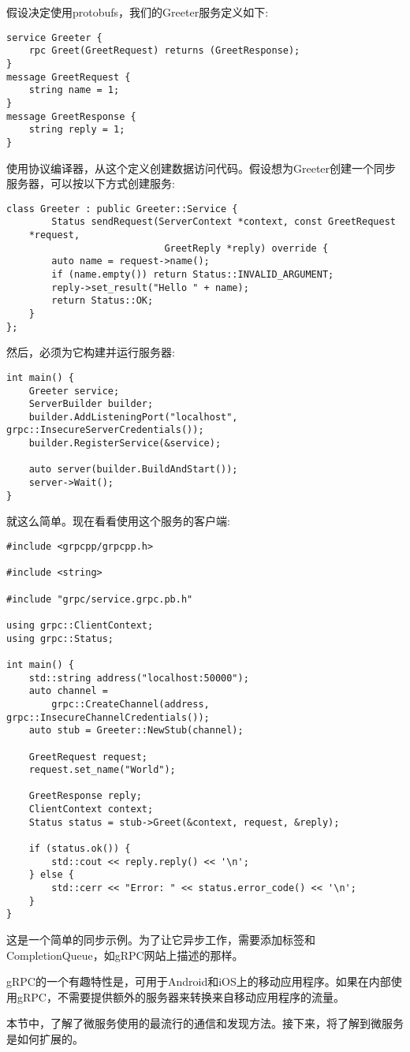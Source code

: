 假设决定使用protobufs，我们的Greeter服务定义如下:

\begin{lstlisting}[style=styleCXX]
service Greeter {
	rpc Greet(GreetRequest) returns (GreetResponse);
}
message GreetRequest {
	string name = 1;
}
message GreetResponse {
	string reply = 1;
}
\end{lstlisting}

使用协议编译器，从这个定义创建数据访问代码。假设想为Greeter创建一个同步服务器，可以按以下方式创建服务:

\begin{lstlisting}[style=styleCXX]
class Greeter : public Greeter::Service {
		Status sendRequest(ServerContext *context, const GreetRequest
	*request,
							GreetReply *reply) override {
		auto name = request->name();
		if (name.empty()) return Status::INVALID_ARGUMENT;
		reply->set_result("Hello " + name);
		return Status::OK;
	}
};
\end{lstlisting}

然后，必须为它构建并运行服务器:

\begin{lstlisting}[style=styleCXX]
int main() {
	Greeter service;
	ServerBuilder builder;
	builder.AddListeningPort("localhost", grpc::InsecureServerCredentials());
	builder.RegisterService(&service);
	
	auto server(builder.BuildAndStart());
	server->Wait();
}
\end{lstlisting}

就这么简单。现在看看使用这个服务的客户端:

\begin{lstlisting}[style=styleCXX]
#include <grpcpp/grpcpp.h>

#include <string>

#include "grpc/service.grpc.pb.h"

using grpc::ClientContext;
using grpc::Status;

int main() {
	std::string address("localhost:50000");
	auto channel =
		grpc::CreateChannel(address, grpc::InsecureChannelCredentials());
	auto stub = Greeter::NewStub(channel);
	
	GreetRequest request;
	request.set_name("World");
	
	GreetResponse reply;
	ClientContext context;
	Status status = stub->Greet(&context, request, &reply);
	
	if (status.ok()) {
		std::cout << reply.reply() << '\n';
	} else {
		std::cerr << "Error: " << status.error_code() << '\n';
	}
}
\end{lstlisting}

这是一个简单的同步示例。为了让它异步工作，需要添加标签和CompletionQueue，如gRPC网站上描述的那样。

gRPC的一个有趣特性是，可用于Android和iOS上的移动应用程序。如果在内部使用gRPC，不需要提供额外的服务器来转换来自移动应用程序的流量。

本节中，了解了微服务使用的最流行的通信和发现方法。接下来，将了解到微服务是如何扩展的。




